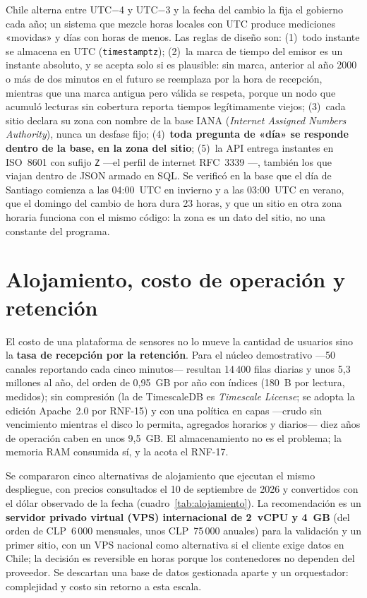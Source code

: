 Chile alterna entre UTC$-$4 y UTC$-$3 y la fecha del cambio la fija el gobierno cada año; un sistema que
mezcle horas locales con UTC produce mediciones «movidas» y días con horas de menos. Las reglas de
diseño son: (1)~todo instante se almacena en UTC (\texttt{timestamptz}); (2)~la marca de tiempo del
emisor es un instante absoluto, y se acepta solo si es plausible: sin marca, anterior al año 2000 o más
de dos minutos en el futuro se reemplaza por la hora de recepción, mientras que una marca antigua pero
válida se respeta, porque un nodo que acumuló lecturas sin cobertura reporta tiempos legítimamente
viejos; (3)~cada sitio declara su zona con nombre de la base IANA (\emph{Internet Assigned Numbers Authority}), nunca un desfase fijo; (4)~\textbf{toda pregunta
de «día» se responde dentro de la base, en la zona del sitio}; (5)~la API entrega instantes en ISO~8601
\parencite{iso8601} con sufijo \texttt{Z} —el perfil de internet RFC~3339 \parencite{rfc3339}—, también los
que viajan dentro de JSON armado en SQL. Se verificó en la base que
el día de Santiago comienza a las 04:00~UTC en invierno y a las 03:00~UTC en verano, que el domingo del
cambio de hora dura 23 horas, y que un sitio en otra zona horaria funciona con el mismo código: la zona
es un dato del sitio, no una constante del programa.

\section{Alojamiento, costo de operación y retención}

El costo de una plataforma de sensores no lo mueve la cantidad de usuarios sino la \textbf{tasa de
recepción por la retención}. Para el núcleo demostrativo —50 canales reportando cada cinco minutos—
resultan 14\,400 filas diarias y unos 5,3 millones al año, del orden de 0,95~GB por año con índices (180~B por lectura, medidos); sin compresión
(la de TimescaleDB es \emph{Timescale License}; se adopta la edición Apache~2.0 por RNF-15) y con una política
en capas —crudo sin vencimiento mientras el disco lo permita, agregados horarios y diarios— diez años de
operación caben en unos 9,5~GB. El almacenamiento no es el problema; la
memoria RAM consumida sí, y la acota el RNF-17.

Se compararon cinco alternativas de alojamiento que ejecutan el mismo despliegue, con precios
consultados el 10 de septiembre de 2026 y convertidos con el dólar observado de la fecha
(cuadro~\ref{tab:alojamiento}). La recomendación es un \textbf{servidor privado virtual (VPS) internacional de 2~vCPU y 4~GB} (del
orden de CLP~6\,000 mensuales, unos CLP~75\,000 anuales) para la validación y un primer sitio, con un
VPS nacional como alternativa si el cliente exige datos en Chile; la decisión es reversible en horas
porque los contenedores no dependen del proveedor. Se descartan una base de datos gestionada aparte y
un orquestador: complejidad y costo sin retorno a esta escala.

